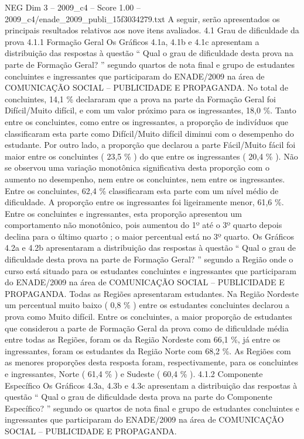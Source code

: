 \begin{textsample}{NEG Dim 3 – 2009\_c4 – Score 1.00 – 2009\_c4/enade\_2009\_publi\_15f3034279.txt}
A seguir, serão apresentados os principais resultados relativos aos nove itens avaliados. 4.1 Grau de dificuldade da prova 4.1.1 Formação Geral Os Gráficos 4.1a, 4.1b e 4.1c apresentam a distribuição das respostas à questão “ Qual o grau de dificuldade desta prova na parte de Formação Geral? ” segundo quartos de nota final e grupo de estudantes concluintes e ingressantes que participaram do ENADE/2009 na área de COMUNICAÇÃO SOCIAL – PUBLICIDADE E PROPAGANDA.
No total de concluintes, 14,1 \% declararam que a prova na parte da Formação Geral foi Difícil/Muito difícil, e com um valor próximo para os ingressantes, 18,0 \%.
Tanto entre os concluintes, como entre os ingressantes, a proporção de indivíduos que classificaram esta parte como Difícil/Muito difícil diminui com o desempenho do estudante.
Por outro lado, a proporção que declarou a parte Fácil/Muito fácil foi maior entre os concluintes ( 23,5 \% ) do que entre os ingressantes ( 20,4 \% ).
Não se observou uma variação monotônica significativa desta proporção com o aumento no desempenho, nem entre os concluintes, nem entre os ingressantes.
Entre os concluintes, 62,4 \% classificaram esta parte com um nível médio de dificuldade.
A proporção entre os ingressantes foi ligeiramente menor, 61,6 \%.
Entre os concluintes e ingressantes, esta proporção apresentou um comportamento não monotônico, pois aumentou do 1º até o 3º quarto depois declina para o último quarto ; o maior percentual está no 3º quarto.
Os Gráficos 4.2a e 4.2b apresentaram a distribuição das respostas à questão “ Qual o grau de dificuldade desta prova na parte de Formação Geral? ” segundo a Região onde o curso está situado para os estudantes concluintes e ingressantes que participaram do ENADE/2009 na área de COMUNICAÇÃO SOCIAL – PUBLICIDADE E PROPAGANDA.
Todas as Regiões apresentaram estudantes.
Na Região Nordeste um percentual muito baixo ( 0,8 \% ) entre os estudantes concluintes declarou a prova como Muito difícil.
Entre os concluintes, a maior proporção de estudantes que considerou a parte de Formação Geral da prova como de dificuldade média entre todas as Regiões, foram os da Região Nordeste com 66,1 \%, já entre os ingressantes, foram os estudantes da Região Norte com 68,2 \%.
As Regiões com as menores proporções desta resposta foram, respectivamente, para os concluintes e ingressantes, Norte ( 61,4 \% ) e Sudeste ( 60,4 \% ). 4.1.2 Componente Específico Os Gráficos 4.3a, 4.3b e 4.3c apresentam a distribuição das respostas à questão “ Qual o grau de dificuldade desta prova na parte do Componente Específico? ” segundo os quartos de nota final e grupo de estudantes concluintes e ingressantes que participaram do ENADE/2009 na área de COMUNICAÇÃO SOCIAL – PUBLICIDADE E PROPAGANDA.

\end{textsample}
